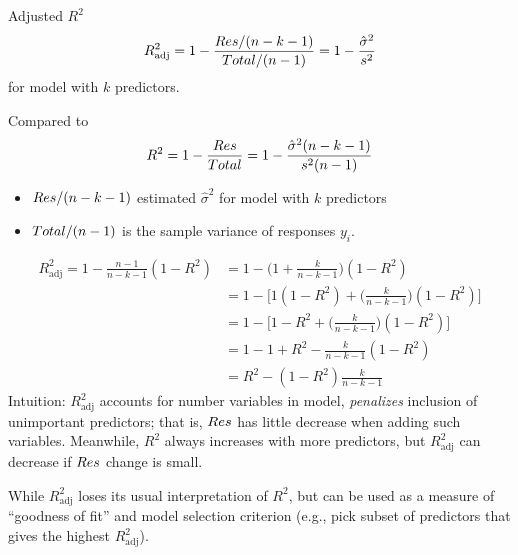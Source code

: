 \begin{Definition}{Adjusted $ R^2 $}{}
    \[ R^2_{\text{adj}}=1-\frac{\relax{Res}/(n-k-1)}{
            \relax{Total}/(n-1)
        }=1-\frac{\hat{\sigma}^2}{s^2}  \]
    for model with $ k $ predictors.
\end{Definition}
Compared to
\[ R^2=1-\frac{\relax{Res}}{\relax{Total}}=1-\frac{\hat{\sigma}^2(n-k-1)}{s^2(n-1)}   \]
\begin{itemize}
    \item $ \relax{Res}/(n-k-1) $
          estimated $ \hat{\sigma}^2 $
          for model with $ k $ predictors
    \item $ \relax{Total}/(n-1) $ is the sample variance
          of responses $ y_i $.
\end{itemize}
\begin{align*}
    R^2_{\text{adj}}=1-\frac{n-1}{n-k-1}(1-R^2)
     & = 1-\biggl( 1+\frac{k}{n-k-1} \biggr)
    (1-R^2)                                                               \\
     & =1-\biggl[ 1(1-R^2)+\biggl( \frac{k}{n-k-1} \biggr)(1-R^2) \biggr] \\
     & =1-\biggl[ 1-R^2+\biggl( \frac{k}{n-k-1}  \biggr)(1-R^2) \biggr]   \\
     & =1-1+R^2-\frac{k}{n-k-1} (1-R^2)                                   \\
     & =R^2-(1-R^2)\frac{k}{n-k-1}
\end{align*}
Intuition: $ R^2_{\text{adj}} $
accounts for number variables in model,
\emph{penalizes} inclusion of unimportant
predictors; that is, $ \relax{Res} $
has little decrease when adding
such variables. Meanwhile, $ R^2 $
always increases with more predictors,
but $ R^2_{\text{adj}} $ can decrease
if $ \relax{Res} $ change is small.

While $ R^2_{\text{adj}} $ loses its usual
interpretation of $ R^2 $, but can be used
as a measure of ``goodness of fit''
and model selection criterion (e.g.,
pick subset of predictors that gives the highest
$ R^2_{\text{adj}} $).


